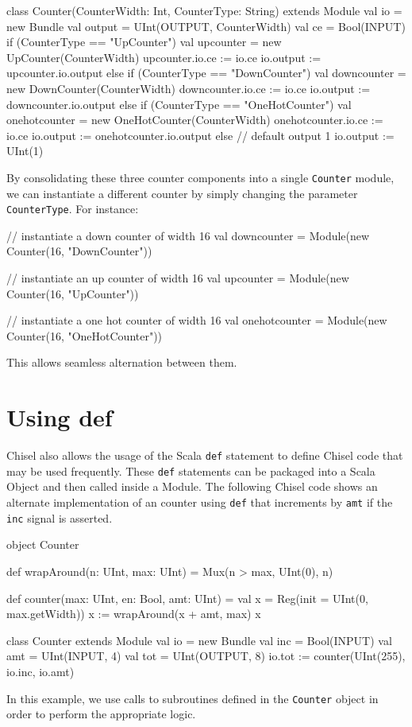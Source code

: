 \documentclass[twocolumn, 10pt]{article}
\begin{document}
\begin{scala}
class Counter(CounterWidth: Int, CounterType: String) 
    extends Module {
  val io = new Bundle {
    val output = UInt(OUTPUT, CounterWidth)
    val ce     = Bool(INPUT)
  }
  if (CounterType == "UpCounter") {
     val upcounter = new UpCounter(CounterWidth)
     upcounter.io.ce := io.ce
     io.output := upcounter.io.output
  } else if (CounterType == "DownCounter") {
    val downcounter = new DownCounter(CounterWidth)
    downcounter.io.ce := io.ce
    io.output := downcounter.io.output
  } else if (CounterType == "OneHotCounter") {
    val onehotcounter = new OneHotCounter(CounterWidth)
    onehotcounter.io.ce := io.ce
    io.output := onehotcounter.io.output
  } else {
    // default output 1
    io.output := UInt(1)
  }
}
\end{scala}

By consolidating these three counter components into a single \verb+Counter+ module, we can instantiate a different counter by simply changing the parameter \verb+CounterType+. For instance:

\begin{scala}
// instantiate a down counter of width 16
val downcounter = 
  Module(new Counter(16, "DownCounter"))

// instantiate an up counter of width 16
val upcounter = 
  Module(new Counter(16, "UpCounter"))

// instantiate a one hot counter of width 16
val onehotcounter = 
  Module(new Counter(16, "OneHotCounter"))
\end{scala}

This allows seamless alternation between them.

\section{Using def}

Chisel also allows the usage of the Scala \verb+def+ statement to define Chisel code that may be used frequently. These \verb+def+ statements can be packaged into a Scala Object and then called inside a Module. The following Chisel code shows an alternate implementation of an counter using \verb+def+ that increments by \verb+amt+ if the \verb+inc+ signal is asserted.

\begin{scala} 
object Counter {
  def wrapAround(n: UInt, max: UInt) = 
    Mux(n > max, UInt(0), n)

  def counter(max: UInt, en: Bool, amt: UInt) = {
    val x = Reg(init = UInt(0, max.getWidth))
    x := wrapAround(x + amt, max)
    x
  }
}

class Counter extends Module {
  val io = new Bundle {
    val inc = Bool(INPUT)
    val amt = UInt(INPUT,  4)
    val tot = UInt(OUTPUT, 8)
  }
  io.tot := counter(UInt(255), io.inc, io.amt)
}
\end{scala}
 
\noindent
In this example, we use calls to subroutines defined in the \verb+Counter+ object in order to perform the appropriate logic. 

\end{document}
